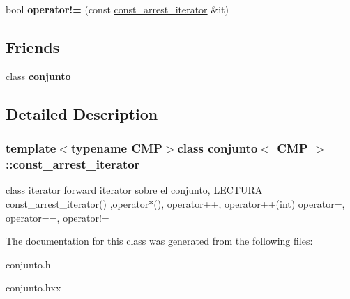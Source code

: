 \begin{DoxyCompactItemize}
\item 
\hypertarget{classconjunto_1_1const__arrest__iterator_afa78fd2ecba1ffda0c659bbb23319ea3}{}bool {\bfseries operator!=} (const \hyperlink{classconjunto_1_1const__arrest__iterator}{const\+\_\+arrest\+\_\+iterator} \&it)\label{classconjunto_1_1const__arrest__iterator_afa78fd2ecba1ffda0c659bbb23319ea3}

\end{DoxyCompactItemize}
\subsection*{Friends}
\begin{DoxyCompactItemize}
\item 
\hypertarget{classconjunto_1_1const__arrest__iterator_a42fdcda39c77eabd7380e29fcdbe5dd2}{}class {\bfseries conjunto}\label{classconjunto_1_1const__arrest__iterator_a42fdcda39c77eabd7380e29fcdbe5dd2}

\end{DoxyCompactItemize}


\subsection{Detailed Description}
\subsubsection*{template$<$typename C\+M\+P$>$class conjunto$<$ C\+M\+P $>$\+::const\+\_\+arrest\+\_\+iterator}

class iterator forward iterator sobre el conjunto, L\+E\+C\+T\+U\+R\+A const\+\_\+arrest\+\_\+iterator() ,operator$\ast$(), operator++, operator++(int) operator=, operator==, operator!= 

The documentation for this class was generated from the following files\+:\begin{DoxyCompactItemize}
\item 
conjunto.\+h\item 
conjunto.\+hxx\end{DoxyCompactItemize}
